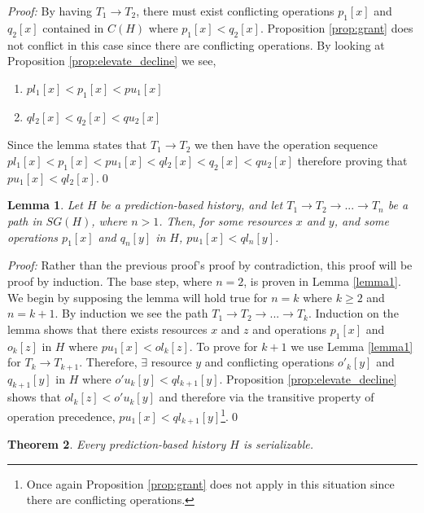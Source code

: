 \documentclass[conference]{IEEEtran}
\newtheorem{theorem}{Theorem}
\newtheorem{lemma}[theorem]{Lemma}
\begin{document}
\textit{Proof:} By having $T_{1} \rightarrow T_{2}$, there must exist conflicting operations $p_{1}[x]$ and $q_{2}[x]$ contained in $C(H)$ where $p_{1}[x] < q_{2}[x]$. Proposition \ref{prop:grant} does not conflict in this case since there are conflicting operations. By looking at Proposition \ref{prop:elevate_decline} we see,

\begin{enumerate}
  \item $pl_{1}[x] < p_{1}[x] < pu_{1}[x]$
  \item $ql_{2}[x] < q_{2}[x] < qu_{2}[x]$
\end{enumerate}

Since the lemma states that $T_{1} \rightarrow T_{2}$ we then have the operation sequence $pl_{1}[x] < p_{1}[x] < pu_{1}[x] < ql_{2}[x] < q_{2}[x] < qu_{2}[x]$ therefore proving that $pu_{1}[x] < ql_{2}[x]$.\qed

\begin{lemma}
\label{lemma2}
Let $H$ be a prediction-based history, and let $T_{1} \rightarrow T_{2} \rightarrow ... \rightarrow T_{n}$ be a path in $SG(H)$, where $n > 1$. Then, for some resources $x$ and $y$, and some operations $p_{1}[x]$ and $q_{n}[y]$ in $H$, $pu_{1}[x] < ql_{n}[y]$.
\end{lemma}

\textit{Proof:} Rather than the previous proof's proof by contradiction, this proof will be proof by induction. The base step, where $n = 2$, is proven in Lemma \ref{lemma1}. We begin by supposing the lemma will hold true for $n = k$ where $k \geq 2$ and $n = k + 1$. By induction we see the path $T_{1} \rightarrow T_{2} \rightarrow ... \rightarrow T_{k}$. Induction on the lemma shows that there exists resources $x$ and $z$ and operations $p_{1}[x]$ and $o_{k}[z]$ in $H$ where $pu_{1}[x] < ol_{k}[z]$. To prove for $k + 1$ we use Lemma \ref{lemma1} for $T_{k} \rightarrow T_{k+1}$. Therefore, $\exists$ resource $y$ and conflicting operations $o'_{k}[y]$ and $q_{k+1}[y]$ in $H$ where $o'u_{k}[y] < ql_{k+1}[y]$. Proposition \ref{prop:elevate_decline} shows that $ol_{k}[z] < o'u_{k}[y]$ and therefore via the transitive property of operation precedence, $pu_{1}[x] < ql_{k+1}[y]$\footnote{\label{note1}Once again Proposition \ref{prop:grant} does not apply in this situation since there are conflicting operations.}.\qed

\begin{theorem}
\label{theorem1}
Every prediction-based history $H$ is serializable.
\end{theorem}
\end{document}
